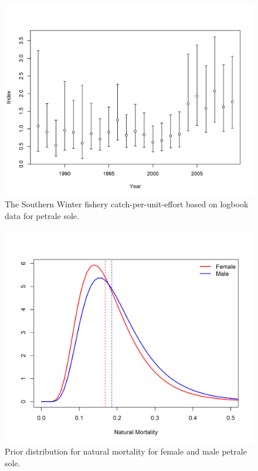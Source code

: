 \documentclass[12pt,]{article}
\begin{document}
\FloatBarrier

\begin{figure}
\centering
\includegraphics{r4ss/plots_mod1/index1_cpuedata_Winter (S).png}
\caption{The Southern Winter fishery catch-per-unit-effort based on
logbook data for petrale sole. \label{fig:south_cpue}}
\end{figure}

\FloatBarrier

\begin{figure}
\centering
\includegraphics{Figures/M_prior.png}
\caption{Prior distribution for natural mortality for female and male
petrale sole. \label{fig:m_prior}}
\end{figure}
\end{document}
